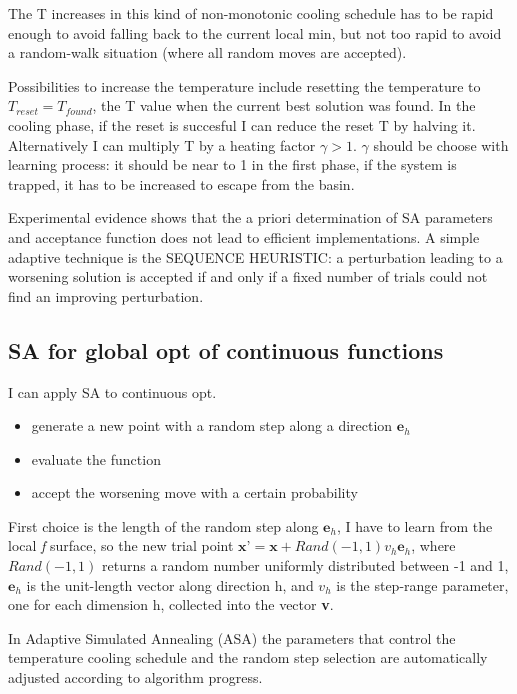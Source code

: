 \documentclass[11pt]{article}
\begin{document}
The T increases in this kind of non-monotonic cooling schedule has to be rapid enough to avoid falling back to the current local min, but not too rapid to avoid a random-walk situation (where all random moves are accepted).

Possibilities to increase the temperature include resetting the temperature to $ T_{reset} = T_{found} $, the T value when the current best solution was found. 
In the cooling phase, if the reset is succesful I can reduce the reset T by halving it.
Alternatively I can multiply T by a heating factor $ \gamma > 1 $. $ \gamma $ should be choose with learning process: it should be near to 1 in the first phase, if the system is trapped, it has to be increased to escape from the basin.

Experimental evidence shows that the a priori determination of SA parameters and acceptance function does not
lead to efficient implementations. A simple adaptive technique is the SEQUENCE HEURISTIC: a perturbation leading to a worsening solution is accepted if and only if a fixed number of trials could not find an improving perturbation.

\subsection{SA for global opt of continuous functions}
I can apply SA to continuous opt. 

\begin{itemize}
\item generate a new point with a random step along a direction $ \textbf{e}_h $
\item evaluate the function
\item accept the worsening move with a certain probability
\end{itemize}

First choice is the length of the random step along $ \textbf{e}_h $, I  have to learn from the local \textit{f} surface, so the new trial point $ \textbf{x'} = \textbf{x} + Rand(-1,1)v_h \textbf{e}_h $, where $ Rand(-1, 1) $ returns a random number uniformly distributed between -1 and 1,  $ \textbf{e}_h $ is the unit-length vector along direction h, and $ v_h $ is the step-range parameter, one for each dimension h, collected into the vector \textbf{v}.

In Adaptive Simulated Annealing (ASA) the parameters that control the temperature cooling schedule and the random step selection are automatically adjusted according to algorithm progress.
\end{document}
